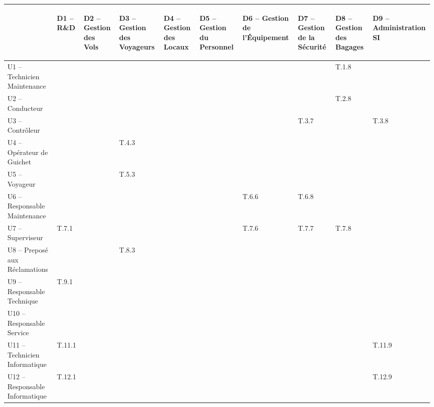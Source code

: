 \providecommand{\DJSPU}[1]{}


\begin {tabular} {| l | l | l | l | l | l | l | l | l | l | }
\hline
~
&\begin{sideways}D1 -- R\&D\end{sideways}
&\begin{sideways}D2 -- Gestion des Vols\end{sideways}
&\begin{sideways}D3 -- Gestion des Voyageurs\end{sideways}
&\begin{sideways}D4 -- Gestion des Locaux\end{sideways}
&\begin{sideways}D5 -- Gestion du Personnel\end{sideways}
&\begin{sideways}D6 -- Gestion de l'Équipement\end{sideways}
&\begin{sideways}D7 -- Gestion de la Sécurité\end{sideways}
&\begin{sideways}D8 -- Gestion des Bagages\end{sideways}
&\begin{sideways}D9 -- Administration SI\end{sideways}\\
\hline
U1 --  Technicien Maintenance  & & & & & & & &T.1.8 &  \\
\hline
U2 --  Conducteur  & & & & & & & &T.2.8 &  \\
\hline
U3 --  Contrôleur  & & & & & & &T.3.7 & &T.3.8  \\
\hline
U4 --  Opérateur de Guichet  & & &T.4.3 & & & & & &  \\
\hline
U5 --  Voyageur  & & &T.5.3 & & & & & &  \\
\hline
U6 --  Responsable Maintenance  & & & & & &T.6.6 &T.6.8 &  &\\
\hline
U7 --  Superviseur  &\DJSPU1 T.7.1 & & & & &T.7.6 &T.7.7 &T.7.8 &\\
\hline
U8 --  Preposé aux Réclamations  & & &T.8.3 & & & & & &\\
\hline
U9 --  Responsable Technique  &\DJSPU1 T.9.1 & & & & & & & &  \\
\hline
U10 --  Responsable Service  & & & & & & & & &  \\
\hline
U11 --  Technicien Informatique  &T.11.1 & & & & & & & &T.11.9  \\
\hline
U12 --  Responsable Informatique  &T.12.1 & & & & & & & &T.12.9  \\
\hline
\end {tabular}

